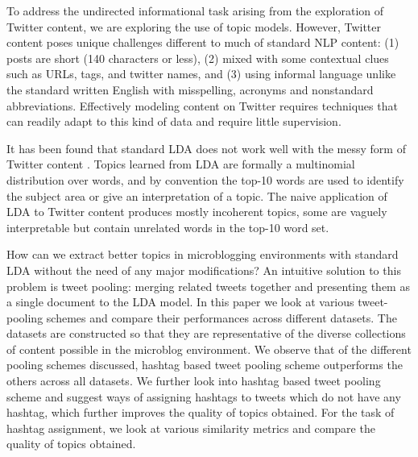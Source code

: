 \documentclass[10pt,a5paper,twoside]{article}
\begin{document}
To address the undirected informational task arising from the 
exploration of Twitter content,
we are exploring the use of topic models.
However, 
Twitter content poses unique challenges different to much of standard
NLP content:  (1)
posts are short (140 characters or less),
(2)
mixed with some contextual clues such as URLs, tags, and twitter names, and
(3)
using informal language unlike the standard written English
with  misspelling, acronyms and nonstandard abbreviations.
Effectively modeling content on Twitter
requires techniques that can readily adapt to this kind of data and
require little supervision.

It has been found that standard LDA \cite{blei03} 
does not work well 
with the messy form of Twitter content \cite{wayne,????}. 
Topics learned from LDA are formally a
multinomial distribution over words, and by convention the top-10
words are used to identify the subject area or give an interpretation
of a topic.   The naive
application of LDA to Twitter content produces mostly incoherent topics,
some are vaguely interpretable but contain unrelated words in the
top-10 word set.

How can we extract better topics in
microblogging environments with standard LDA without the need of any
major modifications?  An intuitive solution to this problem is tweet
pooling: merging related tweets together and presenting them as a
single document to the LDA model.  
In this paper we look at various tweet-pooling schemes and compare
their performances across different datasets. The datasets are
constructed so that they are representative of the diverse
collections of content possible in the microblog environment.
We observe that of the different pooling schemes discussed, hashtag
based tweet pooling scheme outperforms the others across all
datasets. We further look into hashtag based tweet pooling scheme and
suggest ways of assigning hashtags to tweets which do not have any
hashtag, which further improves the quality of topics obtained. For
the task of hashtag assignment, we look at various similarity metrics
and compare the quality of topics obtained.
\end{document}
